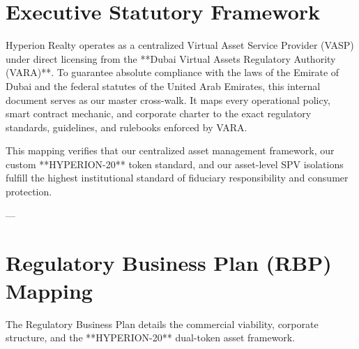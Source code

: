 \documentclass[11pt,a4paper]{article}
\begin{document}

\newpage
\thispagestyle{plain}
\par\vspace{15pt}
\makeatletter
{}
\makeatother
\clearpage

\section{Executive Statutory Framework}
Hyperion Realty operates as a centralized Virtual Asset Service Provider (VASP) under direct licensing from the **Dubai Virtual Assets Regulatory Authority (VARA)**. To guarantee absolute compliance with the laws of the Emirate of Dubai and the federal statutes of the United Arab Emirates, this internal document serves as our master cross-walk. It maps every operational policy, smart contract mechanic, and corporate charter to the exact regulatory standards, guidelines, and rulebooks enforced by VARA.

This mapping verifies that our centralized asset management framework, our custom **HYPERION-20** token standard, and our asset-level SPV isolations fulfill the highest institutional standard of fiduciary responsibility and consumer protection.

---

\section{Regulatory Business Plan (RBP) Mapping}
The Regulatory Business Plan details the commercial viability, corporate structure, and the **HYPERION-20** dual-token asset framework.
\par\vspace{10pt}
\end{document}
